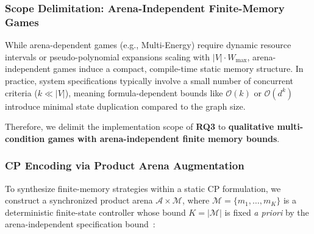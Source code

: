 \documentclass{article}
\begin{document}
\subsubsection{Scope Delimitation: Arena-Independent Finite-Memory Games}
While arena-dependent games (e.g., Multi-Energy) require dynamic resource intervals or pseudo-polynomial expansions scaling with $|V| \cdot W_{\max}$, arena-independent games induce a compact, compile-time static memory structure. In practice, system specifications typically involve a small number of concurrent criteria ($k \ll |V|$), meaning formula-dependent bounds like $\mathcal{O}(k)$ or $\mathcal{O}(d^k)$ introduce minimal state duplication compared to the graph size.

Therefore, we delimit the implementation scope of \textbf{RQ3} to \textbf{qualitative multi-condition games with arena-independent finite memory bounds}.

\subsubsection{CP Encoding via Product Arena Augmentation}
To synthesize finite-memory strategies within a static CP formulation, we construct a synchronized product arena $\mathcal{A} \times \mathcal{M}$, where $\mathcal{M} = \{m_1, \dots, m_K\}$ is a deterministic finite-state controller whose bound $K = |\mathcal{M}|$ is fixed \textit{a priori} by the arena-independent specification bound~\cite{Bouyer:2022}:
\end{document}
